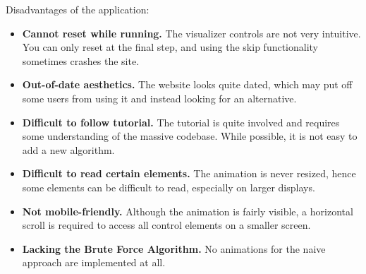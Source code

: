 Disadvantages of the application:
\begin{itemize}
    \item \textbf{Cannot reset while running.} The visualizer controls are not very intuitive. You can only reset at the final step, and using the skip functionality sometimes crashes the site.
    \item \textbf{Out-of-date aesthetics.} The website looks quite dated, which may put off some users from using it and instead looking for an alternative.
    \item \textbf{Difficult to follow tutorial.} The tutorial is quite involved and requires some understanding of the massive codebase. While possible, it is not easy to add a new algorithm.
    \item \textbf{Difficult to read certain elements.} The animation is never resized, hence some elements can be difficult to read, especially on larger displays.
    \item \textbf{Not mobile-friendly.} Although the animation is fairly visible, a horizontal scroll is required to access all control elements on a smaller screen.
    \item \textbf{Lacking the Brute Force Algorithm.} No animations for the naive approach are implemented at all.
\end{itemize}


